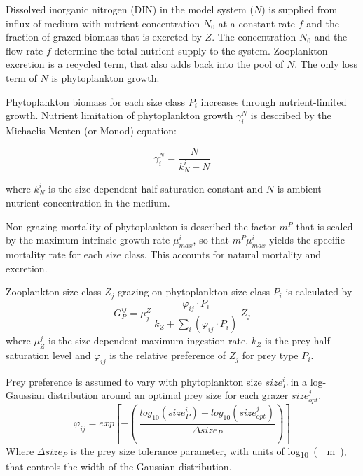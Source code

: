 \documentclass[journal abbreviation, manuscript]{copernicus}
\begin{document}
Dissolved inorganic nitrogen (DIN) in the model system ($N$) is supplied from influx of medium with nutrient concentration $N_0$ at a constant rate $f$ and the fraction of grazed biomass that is excreted by $Z$. The concentration $N_0$ and the flow rate $f$ determine the total nutrient supply to the system. Zooplankton excretion is a recycled term, that also adds back into the pool of $N$. The only loss term of $N$ is phytoplankton growth.

Phytoplankton biomass for each size class $P_i$ increases through nutrient-limited growth. Nutrient limitation of phytoplankton growth $\gamma_i^N$ is described by the Michaelis-Menten (or Monod) equation:

\begin{equation}
    \gamma_i^N =  \frac{N}{k_N^i + N} 
\end{equation}

where $k_N^i$ is the size-dependent half-saturation constant and $N$ is ambient nutrient concentration in the medium.

Non-grazing mortality of phytoplankton is described the factor $m^P$ that is scaled by the maximum intrinsic growth rate $\mu_{max}^i$, so that $m^P \mu_{max}^i$ yields the specific mortality rate for each size class. This accounts for natural mortality and excretion.

Zooplankton size class $Z_j$ grazing on phytoplankton size class $P_i$ is calculated by
\begin{equation}
    G_P^{ij} = \mu_j^Z \ \frac{ \varphi_{ij} \cdot P_i }{ k_Z + \sum_{i}(\varphi_{ij} \cdot P_i) } \ Z_j
\end{equation}
where $\mu_Z^j$ is the size-dependent maximum ingestion rate, $k_Z$ is the prey half-saturation level and $\varphi_{ij}$ is the relative preference of $Z_j$ for prey type $P_i$.

Prey preference is assumed to vary with phytoplankton size $size_{P}^i$ in a log-Gaussian distribution around an optimal prey size for each grazer $size_{opt}^j$.
\begin{equation}
    \varphi_{ij} = exp \left[ -\left( \ \frac{ log_{10}(size_P^i) - log_{10}(size_{opt}^j) }{ \Delta size_{P} } \right) \right]
\end{equation}
Where $\Delta size_{P}$ is the prey size tolerance parameter, with units of \unit{log_{10}(\mu m)}, that controls the width of the Gaussian distribution.
\end{document}
